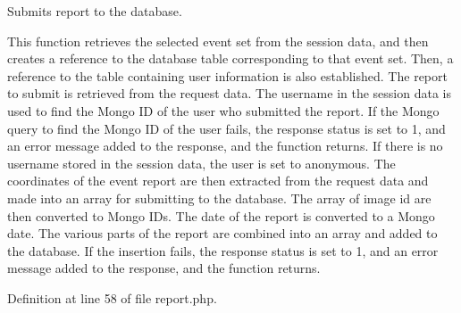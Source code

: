 \-Submits report to the database. 

\-This function retrieves the selected event set from the session data, and then creates a reference to the database table corresponding to that event set. \-Then, a reference to the table containing user information is also established. \-The report to submit is retrieved from the request data. \-The username in the session data is used to find the \-Mongo \-I\-D of the user who submitted the report. \-If the \-Mongo query to find the \-Mongo \-I\-D of the user fails, the response status is set to 1, and an error message added to the response, and the function returns. \-If there is no username stored in the session data, the user is set to anonymous. \-The coordinates of the event report are then extracted from the request data and made into an array for submitting to the database. \-The array of image id are then converted to \-Mongo \-I\-Ds. \-The date of the report is converted to a \-Mongo date. \-The various parts of the report are combined into an array and added to the database. \-If the insertion fails, the response status is set to 1, and an error message added to the response, and the function returns. 

\-Definition at line 58 of file report.\-php.

